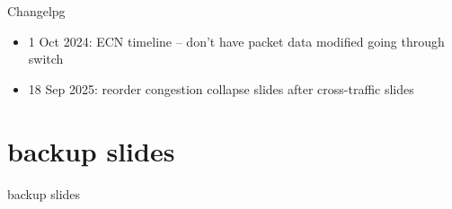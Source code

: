 \date{}
\title{}
\date{}
\usepackage{pgfplots}
\pgfplotsset{compat=1.16}

\begin{frame}
    \titlepage
\end{frame}

{\changelogmode
\begin{frame}{Changelpg}
\begin{itemize}
\item 1 Oct 2024: ECN timeline -- don't have packet data modified going through switch
\item 18 Sep 2025: reorder congestion collapse slides after cross-traffic slides
\end{itemize}
\end{frame}
}





\section{backup slides}
\begin{frame}{backup slides}
\end{frame}




